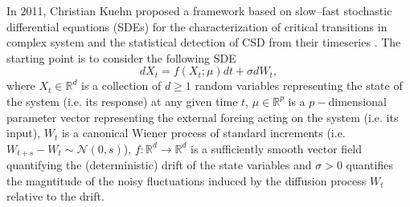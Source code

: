 In 2011, Christian Kuehn proposed a framework based on slow--fast stochastic differential equations (SDEs) for the characterization of critical transitions in complex system and the statistical detection of CSD from their timeseries \cite{Kuehn2011}.
The starting point is to consider the following SDE
%
\begin{equation}\label{eq:sde}
     dX_t = f(X_t;\mu)dt + \sigma dW_t ,
\end{equation}
%
where $X_t\in \mathbb{R}^{d}$ is a collection of $d\geq1$ random variables representing the state of the system (i.e. its response) at any given time $t$, $\mu\in \mathbb{R}^{p}$ is a $p-$dimensional parameter vector representing the external forcing acting on the system (i.e. its input), $W_t$ is a canonical Wiener process of standard increments (i.e. $W_{t+s}-W_t\sim\mathcal{N}(0,s)$), $f:\mathbb{R}^{d}\to \mathbb{R}^{d}$ is a sufficiently smooth vector field quantifying the (deterministic) drift of the state variables and $\sigma>0$ quantifies the magntitude of the noisy fluctuations induced by the diffusion process $W_t$ relative to the drift.

